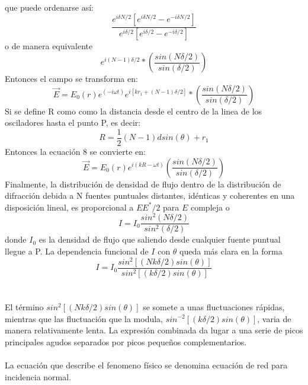 \documentclass[12]{article}
\begin{document}
\begin{multicols}{2}
que puede ordenarse así:
\begin{equation}
\frac{e^{i\delta N/2}[e^{i\delta N/2} - e^{-i\delta N/2}]} {e^{i\delta /2}[e^{i\delta /2} - e^{-i\delta /2}]}
\end{equation}
o de manera equivalente
\begin{equation}
e^{i(N -1)\delta/2} * \left( \frac{sin(N\delta /2)}{sin(\delta /2)} \right )
\end{equation}
Entonces el campo se transforma en:
\begin{equation}
\vec{E} = E_{0}(r)e^{(-i\omega t)}e^{i[kr_{1} + (N -1)\delta/2]}* \left ( \frac{sin(N\delta /2)}{sin(\delta /2)} \right )
\end{equation}
Si se define R como  como la distancia desde el centro de la linea de los osciladores hasta el punto P, es decir:
\begin{equation}
R = \frac{1}{2}(N-1)d sin(\theta) + r_{1}
\end{equation}
Entonces la ecuación 8 se convierte en:
\begin{equation}
\vec{E} = E_{0}(r)e^{i(kR - \omega t)} \left ( \frac{sin(N\delta /2)}{sin(\delta /2)} \right )
\end{equation}
Finalmente, la distribución de densidad de flujo dentro de la distribución de difracción debida a N fuentes puntuales distantes, idénticas y coherentes en una disposición lineal, es proporcional a $EE^{*}/2$ para $E$ compleja  o
\begin{equation}
I = I_{0}\frac{sin^{2}(N\delta/2)}{sin^{2}(\delta/2)}
\end{equation}
donde $I_{0}$ es la densidad de flujo que saliendo desde cualquier fuente puntual llegue a P. La dependencia funcional de $I$ con $\theta$ queda más clara en la forma 
\begin{equation}
I = I_{0}\frac{sin^{2}[(Nk\delta/2)sin(\theta)]}{sin^{2}[(k\delta/2)sin(\theta)]}
\end{equation}
\\ \\
El término $sin^{2}[(Nk\delta/2)sin(\theta)]$ se somete a unas fluctuaciones rápidas, mientras que las fluctuación que la modula, $sin^{-2}[(k\delta/2)sin(\theta)]$, varia de manera relativamente lenta. La expresión combinada da lugar a una serie de picos principales agudos separados por picos pequeños complementarios.\\ \\
La ecuación que describe el fenomeno físico se denomina ecuación de red para incidencia normal. 
\begin{equation}

\end{equation}
\end{multicols}
\end{document}
